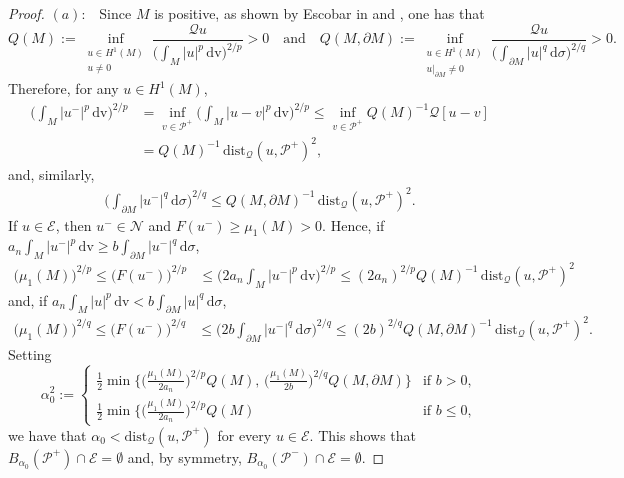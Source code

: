 \documentclass[reqno,11pt,oneside]{amsart}
\numberwithin{equation}{section}
\def\im{\int_{M}}
\def\idm{\int_{\partial M}}
\def\cE{\mathcal{E}}
\def\cN{\mathcal{N}}
\def\cP{\mathcal{P}}
\def\d{\,\mathrm{d}}
\def\dv{\,\mathrm{dv}}
\def\dist{\mathrm{dist}}
\begin{document}
\begin{proof}
$(a):$ \ Since $M$ is positive, as shown by Escobar in \cite{e1} and \cite{e2}, one has that
\begin{equation}\label{eq:escobarQ}
Q(M):=\inf_{\substack{u\in H^1(M) \\ u\neq 0}}\frac{\mathscr{Q}u}{\big(\im |u|^p\dv\big)^{2/p}}>0\quad\text{and}\quad
Q(M,\partial M):=\inf_{\substack{u\in H^1(M) \\ u|_{\partial M}\neq 0}}\frac{\mathscr{Q}u}{\Big(\idm |u|^q\d \sigma\Big)^{2/q}}>0.
\end{equation}
Therefore, for any $u\in H^1(M)$,
\begin{align}\label{eq:p}
\Big(\im |u^-|^p\dv\Big)^{2/p}&=\inf_{v\in\cP^+}\Big(\im |u-v|^p\dv\Big)^{2/p}\leq \inf_{v\in\cP^+}Q(M)^{-1} \mathscr{Q}[u-v]\nonumber\\
&= Q(M)^{-1}\,\dist_\mathscr{Q}(u,\cP^+)^2,
\end{align}
and, similarly,
\begin{align}\label{eq:q}
\Big(\idm |u^-|^q\d \sigma\Big)^{2/q}\leq Q(M,\partial M)^{-1}\,\dist_\mathscr{Q}(u,\cP^+)^2.
\end{align}
If $u\in\cE$, then $u^-\in\cN$ and $F(u^-)\geq \mu_1(M)>0$. Hence, if $a_n\im |u^-|^p\dv\geq b\idm |u^-|^q\d \sigma$, 
\begin{align*}
\big(\mu_1(M)\big)^{2/p}\leq\big(F(u^-)\big)^{2/p}&\leq \Big(2a_n\im |u^-|^p\dv\Big)^{2/p}\leq (2a_n)^{2/p}Q(M)^{-1}\,\dist_\mathscr{Q}(u,\cP^+)^2
\end{align*}
and, if $a_n\im |u|^p\dv < b\idm |u|^q\d \sigma$,
\begin{align*}
\big(\mu_1(M)\big)^{2/q}\leq\big(F(u^-)\big)^{2/q}&\leq \Big(2b\idm |u^-|^q\d \sigma\Big)^{2/q}\leq (2b)^{2/q}Q(M,\partial M)^{-1}\,\dist_\mathscr{Q}(u,\cP^+)^2.
\end{align*}
Setting 
\begin{equation*}
\alpha_0^2:=
\begin{cases}
\frac{1}{2}\min\Big\{\Big(\frac{\mu_1(M)}{2a_n}\Big)^{2/p}Q(M),\,\Big(\frac{\mu_1(M)}{2b}\Big)^{2/q}Q(M,\partial M)\Big\} &\text{if \ }b>0,\\
\frac{1}{2}\min\Big\{\Big(\frac{\mu_1(M)}{2a_n}\Big)^{2/p}Q(M) &\text{if \ }b\leq 0,
\end{cases}
\end{equation*}
we have that $\alpha_0<\dist_\mathscr{Q}(u,\cP^+)$ for every $u\in\cE$. This shows that $B_{\alpha_0}(\cP^+)\cap\cE=\emptyset$ and, by symmetry, $B_{\alpha_0}(\cP^-)\cap\cE=\emptyset$.


\end{proof}
\end{document}

